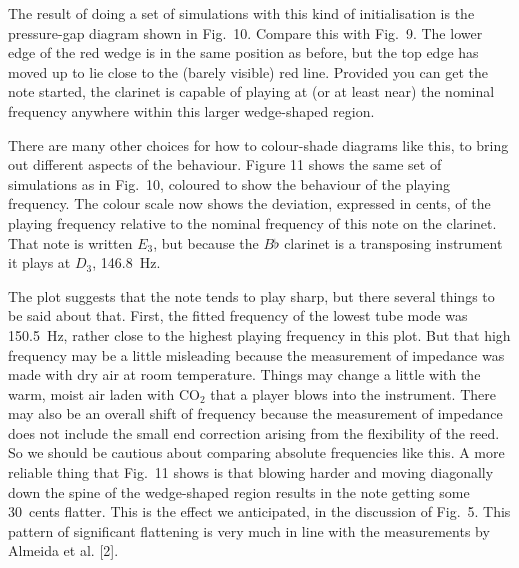   The result of doing a set of simulations with this kind of initialisation is 
  the pressure-gap diagram shown in Fig.\ 10. Compare this with Fig.\ 9. The 
  lower edge of the red wedge is in the same position as before, but the top 
  edge has moved up to lie close to the (barely visible) red line. Provided you 
  can get the note started, the clarinet is capable of playing at (or at least 
  near) the nominal frequency anywhere within this larger wedge-shaped region. 


  There are many other choices for how to colour-shade diagrams like this, to 
  bring out different aspects of the behaviour. Figure 11 shows the same set of 
  simulations as in Fig.\ 10, coloured to show the behaviour of the playing 
  frequency. The colour scale now shows the deviation, expressed in cents, of 
  the playing frequency relative to the nominal frequency of this note on the 
  clarinet. That note is written $E_3$, but because the $B\flat$ clarinet is a 
  transposing instrument it plays at $D_3$, 146.8~Hz. 


  The plot suggests that the note tends to play sharp, but there several things 
  to be said about that. First, the fitted frequency of the lowest tube mode 
  was 150.5~Hz, rather close to the highest playing frequency in this plot. But 
  that high frequency may be a little misleading because the measurement of 
  impedance was made with dry air at room temperature. Things may change a 
  little with the warm, moist air laden with $\mathrm{CO}_2$ that a player 
  blows into the instrument. There may also be an overall shift of frequency 
  because the measurement of impedance does not include the small end 
  correction arising from the flexibility of the reed. So we should be cautious 
  about comparing absolute frequencies like this. A more reliable thing that 
  Fig.\ 11 shows is that blowing harder and moving diagonally down the spine of 
  the wedge-shaped region results in the note getting some 30~cents flatter. 
  This is the effect we anticipated, in the discussion of Fig.\ 5. This pattern 
  of significant flattening is very much in line with the measurements by 
  Almeida et al. [2]. 

